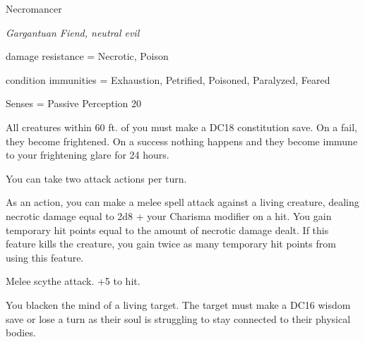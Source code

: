 \begin{monsterbox}{Necromancer}
	\begin{hangingpar}
		\textit{Gargantuan Fiend, neutral evil}
	\end{hangingpar}
	\dndline%
	\basics[%
	armorclass = 16,
	hitpoints  = 82,
	speed      = 30 ft
	]
	\dndline%
	\stats[
	STR = \stat{9}, %
	DEX = \stat{12},
	CON = \stat{14},
	INT = \stat{16},
	WIS = \stat{22},
	CHA = \stat{10}
	]
	\dndline%
	\details[%
	languages = {Common, undead},
	challenge = 6
	]
	\dndline%
	damage resistance = Necrotic, Poison
	
	condition immunities = Exhaustion, Petrified, Poisoned, Paralyzed, Feared	
	
	Senses = Passive Perception 20
	
	\dndline%
	\begin{monsteraction}[Horrify]
		All creatures within 60 ft. of you must make a DC18 constitution save. On a fail, they become frightened. On a success nothing happens and they become immune to your frightening glare for 24 hours.
	\end{monsteraction}	
	\begin{monsteraction}[Multiattack]
		You can take two attack actions per turn.
	\end{monsteraction}
	\begin{monsteraction}
		As an action, you can make a melee spell attack against a living creature, dealing necrotic damage equal to 2d8 + your Charisma modifier on a hit. You gain temporary hit points equal to the amount of necrotic damage dealt. If this feature kills the creature, you gain twice as many temporary hit points from using this feature.
	\end{monsteraction}	
	\begin{monsteraction}
		Melee scythe attack. +5 to hit.
	\end{monsteraction}	
	\begin{monsteraction}
		You blacken the mind of a living target. The target must make a DC16 wisdom save or lose a turn as their soul is struggling to stay connected to their physical bodies.
	\end{monsteraction}		
\end{monsterbox}


